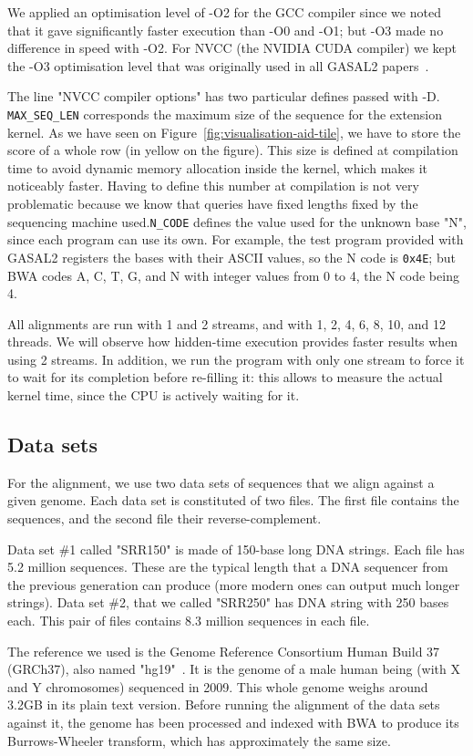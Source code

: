 We applied an optimisation level of -O2 for the GCC compiler since we noted that it gave significantly faster execution than -O0 and -O1; but -O3 made no difference in speed with -O2. For NVCC (the NVIDIA CUDA compiler) we kept the -O3 optimisation level that was originally used in all GASAL2 papers~\cite{Ahmed:gasal}.

The line "NVCC compiler options" has two particular defines passed with -D. \verb|MAX_SEQ_LEN| corresponds the maximum size of the sequence for the extension kernel. As we have seen on Figure~\ref{fig:visualisation-aid-tile}, we have to store the score of a whole row (in yellow on the figure). This size is defined at compilation time to avoid dynamic memory allocation inside the kernel, which makes it noticeably faster. Having to define this number at compilation is not very problematic because we know that queries have fixed lengths fixed by the sequencing machine used.\verb|N_CODE| defines the value used for the unknown base "N", since each program can use its own. For example, the test program provided with GASAL2 registers the bases with their ASCII values, so the N code is \verb|0x4E|; but BWA codes A, C, T, G, and N with integer values from 0 to 4, the N code being 4.

All alignments are run with 1 and 2 streams, and with 1, 2, 4, 6, 8, 10, and 12 threads. We will observe how hidden-time execution provides faster results when using 2 streams. In addition, we run the program with only one stream to force it to wait for its completion before re-filling it: this allows to measure the actual kernel time, since the CPU is actively waiting for it. 

\subsection{Data sets}

For the alignment, we use two data sets of sequences that we align against a given genome. Each data set is constituted of two files. The first file contains the sequences, and the second file their reverse-complement. 

Data set \#1 called "SRR150" is made of 150-base long DNA strings. Each file has 5.2 million sequences. These are the typical length that a DNA sequencer from the previous generation can produce (more modern ones can output much longer strings). Data set \#2, that we called "SRR250" has DNA string with 250 bases each. This pair of files contains 8.3 million sequences in each file.

The reference we used is the Genome Reference Consortium Human Build 37 (GRCh37), also named "hg19"~\cite{ncbi:hg19}. It is the genome of a male human being (with X and Y chromosomes) sequenced in 2009. This whole genome weighs around 3.2GB in its plain text version. Before running the alignment of the data sets against it, the genome has been processed and indexed with BWA to produce its Burrows-Wheeler transform, which has approximately the same size.

